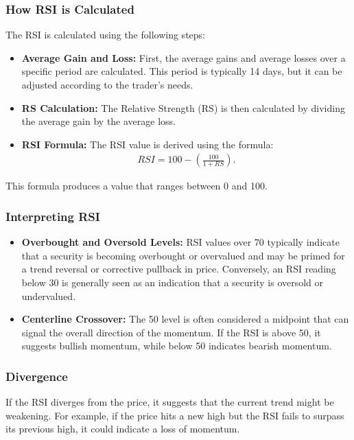 \documentclass{report}
\begin{document}
     \subsubsection{How RSI is Calculated}
     \bigbreak \noindent 
     The RSI is calculated using the following steps:
     \begin{itemize}
         \item \textbf{Average Gain and Loss:} First, the average gains and average losses over a specific period are calculated. This period is typically 14 days, but it can be adjusted according to the trader's needs.
         \item \textbf{RS Calculation:} The Relative Strength (RS) is then calculated by dividing the average gain by the average loss.
         \item \textbf{RSI Formula:} The RSI value is derived using the formula:
             \begin{align*}
                 RSI = 100 - \left(\frac{100}{1+RS}\right)
             .\end{align*}
     \end{itemize}
     This formula produces a value that ranges between 0 and 100.
     \bigbreak \noindent 
     \subsubsection{Interpreting RSI}
     \bigbreak \noindent 
     \begin{itemize}
         \item \textbf{Overbought and Oversold Levels:} RSI values over 70 typically indicate that a security is becoming overbought or overvalued and may be primed for a trend reversal or corrective pullback in price. Conversely, an RSI reading below 30 is generally seen as an indication that a security is oversold or undervalued.
         \item \textbf{Centerline Crossover:} The 50 level is often considered a midpoint that can signal the overall direction of the momentum. If the RSI is above 50, it suggests bullish momentum, while below 50 indicates bearish momentum.
     \end{itemize}
     \bigbreak \noindent 

     \bigbreak \noindent 
     \subsubsection{Divergence}
     \bigbreak \noindent 
     If the RSI diverges from the price, it suggests that the current trend might be weakening. For example, if the price hits a new high but the RSI fails to surpass its previous high, it could indicate a loss of momentum.
     \bigbreak \noindent 
\end{document}
